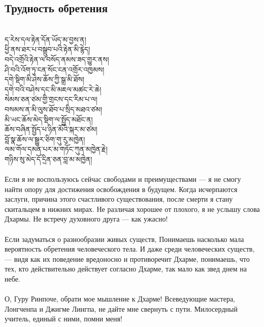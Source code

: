\subsection*{Трудность обретения}
\\
\ti
ད་རེས་དལ་རྟེན་དོན་ཡོད་མ་བྱས་ན།\\
ཕྱི་ནས་ཐར་པ་བསྒྲུབ་པའི་རྟེན་མི་རྙེད།\\
བདེ་འགྲོའི་རྟེན་ལ་བསོད་ནམས་ཟད་གྱུར་ནས།\\
ཤི་བའི་འོག་ཏུ་ངན་སོང་ངན་འགྲོར་འཁྱམས།\\
དགེ་སྡིག་མི་ཤེས་ཆོས་ཀྱི་སྒྲ་མི་ཐོས།\\
དགེ་བའི་བཤེས་དང་མི་མཇལ་མཚང་རེ་ཆེ།\\
སེམས་ཅན་ཙམ་གྱི་གྲངས་དང་རིམ་པ་ལ།\\
བསམས་ན་མི་ལུས་ཐོབ་པ་སྲིད་མཐའ་ཙམ།\\
མི་ཡང་ཆོས་མེད་སྡིག་ལ་སྤྱོད་མཐོང་ན།\\
ཆོས་བཞིན་སྤྱོད་པ་ཉིན་མོའི་སྐར་མ་ཙམ།\\
བློ་སྣ་ཆོས་ལ་སྒྱུར་ཅིག་གུ་རུ་མཁྱེན།\\
ལམ་གོལ་དམན་པར་མ་གཏོང་ཀུན་མཁྱེན་རྗེ།\\
གཉིས་སུ་མེད་དོ་དྲིན་ཅན་བླ་མ་མཁྱེན།\\
\\
\ru
Если я не воспользуюсь сейчас свободами и преимуществами —
я не смогу найти опору для достижения освобождения в будущем.
Когда исчерпаются заслуги, причина этого счастливого существования,
после смерти я стану скитальцем в нижних мирах.
Не различая хорошее от плохого, я не услышу слова Дхармы.
Не встречу духовного друга — как ужасно!\\
\\
Если задуматься о разнообразии живых существ,
Понимаешь насколько мала вероятность обретения человеческого тела.
И даже среди человеческих существ,
— видя как их поведение вредоносно и противоречит Дхарме,
понимаешь, что тех, кто действительно действует согласно Дхарме,
так мало как звед днем на небе.\\
\\
О, Гуру Ринпоче, обрати мое мышление к Дхарме!
Всеведующие мастера, Лонгченпа и Джигме Лингпа,
не дайте мне свернуть с пути.
Милосердный учитель, единый с ними, помни меня!

\newpage

